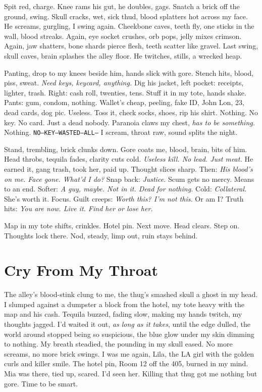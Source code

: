 \documentclass[12pt,oneside]{book}
\newcommand{\note}[1]{\texttt{#1}}
\begin{document}
Spit red, charge. Knee rams his gut, he doubles, gags. Snatch a brick off the ground, swing. Skull cracks, wet, sick thud, blood splatters hot across my face. He screams, gurgling, I swing again. Cheekbone caves, teeth fly, one sticks in the wall, blood streaks. Again, eye socket crushes, orb pops, jelly mixes crimson. Again, jaw shatters, bone shards pierce flesh, teeth scatter like gravel. Last swing, skull caves, brain splashes the alley floor. He twitches, stills, a wrecked heap.

Panting, drop to my knees beside him, hands slick with gore. Stench hits, blood, piss, sweat. \textit{Need keys, keycard, anything.} Dig his jacket, left pocket: receipts, lighter, trash. Right: cash roll, twenties, tens. Stuff it in my tote, hands shake. Pants: gum, condom, nothing. Wallet’s cheap, peeling, fake ID, \textnormal{John Lon}, 23, dead cards, dog pic. Useless. Toss it, check socks, shoes, rip his shirt. Nothing. No key. No card. Just a dead nobody. Paranoia claws my chest, \textit{has to be something.} Nothing. \note{NO—KEY—WASTED—ALL—} I scream, throat raw, sound splits the night.

Stand, trembling, brick clunks down. Gore coats me, blood, brain, bits of him. Head throbs, tequila fades, clarity cuts cold. \textit{Useless kill. No lead. Just meat.} He earned it, gang trash, took her, paid up. Thought slices sharp. Then: \textit{His blood’s on me. Face gone. What’d I do?} Snap back: \textit{Justice.} Scum gets no mercy. Means to an end. Softer: \textit{A guy, maybe. Not in it. Dead for nothing.} Cold: \textit{Collateral.} She’s worth it. Focus. Guilt creeps: \textit{Worth this? I’m not this.} Or am I? Truth hits: \textit{You are now. Live it. Find her or lose her.}

Map in my tote shifts, crinkles. Hotel pin. Next move. Head clears. Step on. Thoughts lock there. Nod, steady, limp out, ruin stays behind.

\chapter{Cry From My Throat}

The alley’s blood-stink clung to me, the thug’s smashed skull a ghost in my head. I slumped against a dumpster a block from the hotel, my tote heavy with the map and his cash. Tequila buzzed, fading slow, making my hands twitch, my thoughts jagged. I’d waited it out, \textit{as long as it takes}, until the edge dulled, the world around stopped being so suspicious, the blue glow under my skin dimming to nothing. My breath steadied, the pounding in my skull eased. No more screams, no more brick swings. I was me again, Lila, the LA girl with the golden curls and killer smile. The hotel pin, Room 12 off the 405, burned in my mind. Mia was there, tied up, scared. I’d seen her. Killing that thug got me nothing but gore. Time to be smart.
\end{document}
